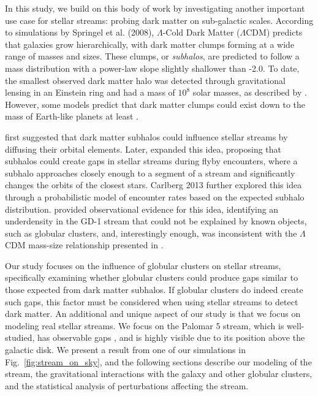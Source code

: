 \documentclass[draft]{aa}
\begin{document}
  In this study, we build on this body of work by investigating another important use case for stellar streams: probing dark matter on sub-galactic scales. According to simulations by Springel et al. (2008), $\Lambda$-Cold Dark Matter ($\Lambda$CDM) predicts that galaxies grow hierarchically, with dark matter clumps forming at a wide range of masses and sizes. These clumps, or \textit{subhalos}, are predicted to follow a mass distribution with a power-law slope slightly shallower than -2.0. To date, the smallest observed dark matter halo was detected through gravitational lensing in an Einstein ring and had a mass of $10^8$ solar masses, as described by \citet{2012Natur.481..341V}. However, some models predict that dark matter clumps could exist down to the mass of Earth-like planets at least \citep[see][ and discussion in \citet{2021arXiv211101148A}]{2005JCAP...08..003G, wang20}. 

  \citet{2002MNRAS.332..915I} first suggested that dark matter subhalos could influence stellar streams by diffusing their orbital elements. Later, \citet{2012ApJ...748...20C} expanded this idea, proposing that subhalos could create gaps in stellar streams during flyby encounters, where a subhalo approaches closely enough to a segment of a stream and significantly changes the orbits of the closest stars. Carlberg 2013 further explored this idea through a probabilistic model of encounter rates based on the expected subhalo distribution. \citet{2019ApJ...880...38B} provided observational evidence for this idea, identifying an underdensity in the GD-1 stream that could not be explained by known objects, such as globular clusters, and, interestingly enough, was inconsistent with the $\Lambda$CDM mass-size relationship presented in \cite{2017MNRAS.466.4974M}.

  Our study focuses on the influence of globular clusters on stellar streams, specifically examining whether globular clusters could produce gaps similar to those expected from dark matter subhalos. If globular clusters do indeed create such gaps, this factor must be considered when using stellar streams to detect dark matter. An additional and unique aspect of our study is that we focus on modeling real stellar streams. We focus on the Palomar 5 stream, which is well-studied, has observable gaps \citep{2020ApJ...889...70B}, and is highly visible due to its position above the galactic disk. We present a result from one of our simulations in Fig.~\ref{fig:stream_on_sky}, and the following sections describe our modeling of the stream, the gravitational interactions with the galaxy and other globular clusters, and the statistical analysis of perturbations affecting the stream.
\end{document}
